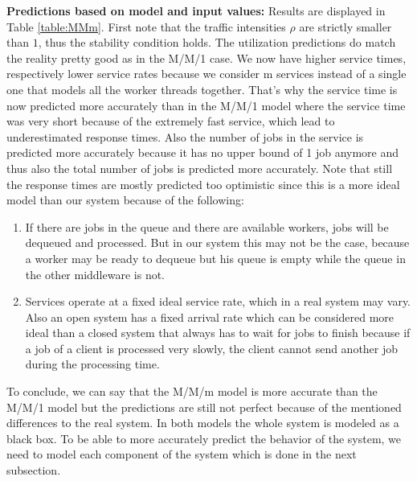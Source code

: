\textbf{Predictions based on model and input values:} 
Results are displayed in Table \ref{table:MMm}.
First note that the traffic intensities $\rho$ are strictly smaller than $1$, thus the stability condition holds.
The utilization predictions do match the reality pretty good as in the M/M/1 case. We now have higher service times, respectively lower service rates because we consider m services instead of a single one that models all the worker threads together. That's why the service time is now predicted more accurately than in the M/M/1 model where the service time was very short because of the extremely fast service, which lead to underestimated response times. 
Also the number of jobs in the service is predicted more accurately because it has no upper bound of 1 job anymore and thus also the total number of jobs is predicted more accurately. 
Note that still the response times are mostly predicted too optimistic since this is a more ideal model than our system because of the following: 
\begin{enumerate}
    \item If there are jobs in the queue and there are available workers, jobs will be dequeued and processed. But in our system this may not be the case, because a worker may be ready to dequeue but his queue is empty while the queue in the other middleware is not.
    \item Services operate at a fixed ideal service rate, which in a real system may vary. Also an open system has a fixed arrival rate which can be considered more ideal than a closed system that always has to wait for jobs to finish because if a job of a client is processed very slowly, the client cannot send another job during the processing time.
\end{enumerate}
To conclude, we can say that the M/M/m model is more accurate than the M/M/1 model but the predictions are still not perfect because of the mentioned differences to the real system. In both models the whole system is modeled as a black box. To be able to more accurately predict the behavior of the system, we need to model each component of the system which is done in the next subsection. 


